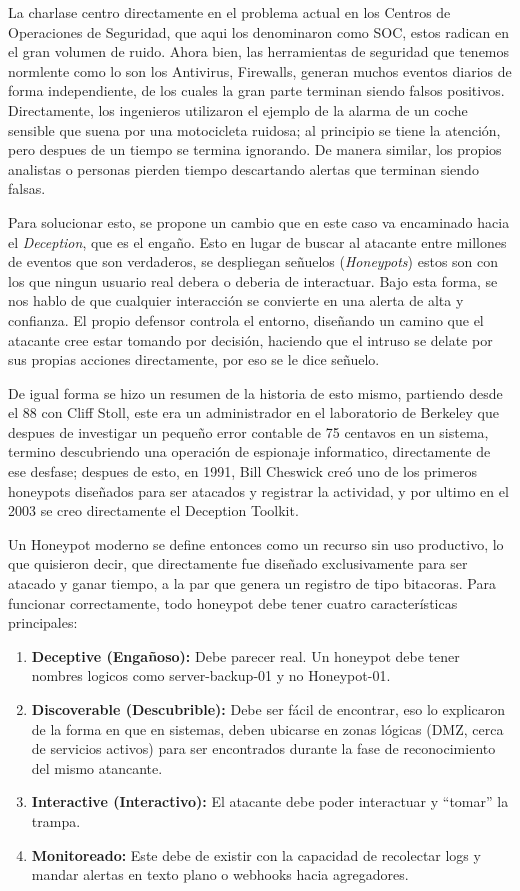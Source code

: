 \documentclass[letterpaper,11pt]{article}
\begin{document}
La charlase centro directamente en el problema actual 
en los Centros de Operaciones de Seguridad, que aqui los denominaron como SOC,
estos radican en el gran volumen de ruido.
Ahora bien, las herramientas de seguridad que tenemos normlente como lo son 
los Antivirus, Firewalls, 
generan muchos eventos diarios de forma independiente,
de los cuales la gran parte terminan siendo falsos positivos. 
Directamente, los ingenieros utilizaron 
el ejemplo de la alarma de un coche sensible 
que suena por una motocicleta ruidosa; 
al principio se tiene la atención, 
pero despues de un tiempo se termina ignorando. 
De manera similar, los propios analistas o personas
pierden tiempo descartando alertas que terminan siendo falsas. 

Para solucionar esto, 
se propone un cambio que en este caso va encaminado hacia el 
\textit{Deception}, que es el engaño. Esto en lugar 
de buscar al atacante entre millones de eventos que son verdaderos,
se despliegan señuelos (\textit{Honeypots}) 
estos son con los que ningun usuario real debera o deberia de 
interactuar. Bajo esta forma, se nos hablo de que 
cualquier interacción se convierte en una alerta de alta y confianza. 
El propio defensor controla el entorno,
diseñando un camino que el atacante cree estar tomando por decisión, 
haciendo que el intruso se delate por sus propias acciones directamente, por eso se le dice señuelo.

De igual forma se hizo un resumen de la historia de esto mismo, partiendo desde
el 88 con Cliff Stoll, este era un administrador 
en el laboratorio de Berkeley que despues de 
investigar un pequeño error contable de 75 
centavos en un sistema,
termino descubriendo una operación de espionaje informatico, directamente 
de ese desfase; despues de esto, en 1991,
Bill Cheswick creó uno de los primeros honeypots diseñados para ser atacados y registrar la actividad, 
y por ultimo en el 2003 se creo directamente el Deception Toolkit.

Un Honeypot moderno se define entonces como un recurso sin uso productivo, 
lo que quisieron decir, que directamente fue diseñado exclusivamente para ser atacado y ganar tiempo, 
a la par que genera un registro de tipo bitacoras. Para funcionar correctamente, todo honeypot debe tener cuatro características principales:

\begin{enumerate}
    \item \textbf{Deceptive (Engañoso):} Debe parecer real. Un honeypot debe tener nombres logicos como server-backup-01 y no Honeypot-01.
    \item \textbf{Discoverable (Descubrible):} Debe ser fácil de encontrar, eso lo explicaron de la forma en que en sistemas, deben ubicarse en zonas lógicas (DMZ, cerca de servicios activos) para ser encontrados durante la fase de reconocimiento del mismo atancante.
    \item \textbf{Interactive (Interactivo):} El atacante debe poder interactuar y ``tomar'' la trampa. 
    \item \textbf{Monitoreado:} Este debe de existir con la capacidad de recolectar logs y mandar alertas en texto plano o webhooks hacia agregadores.
\end{enumerate}
\end{document}
